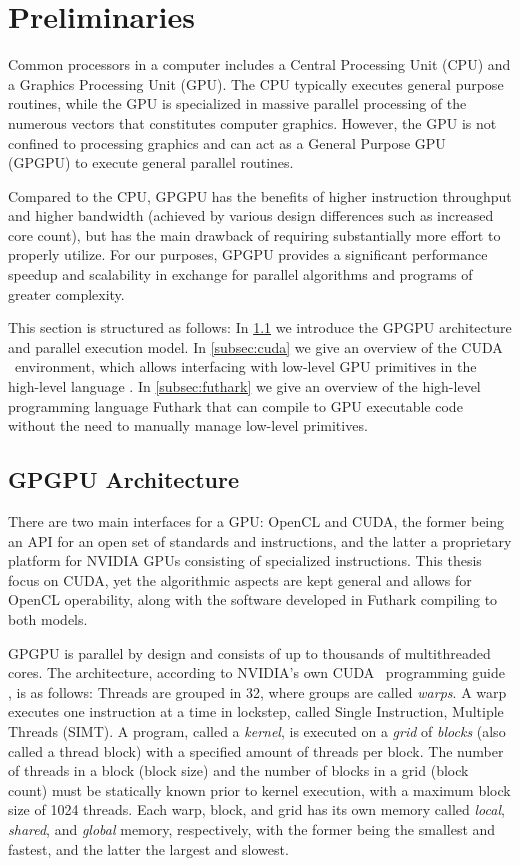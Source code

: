 \section{Preliminaries}
\label{sec:pre}
Common processors in a computer includes a Central Processing Unit (CPU) and a
Graphics Processing Unit (GPU). The CPU typically executes general purpose
routines, while the GPU is specialized in massive parallel processing of the
numerous vectors that constitutes computer graphics. However, the GPU is not
confined to processing graphics and can act as a General Purpose GPU (GPGPU) to
execute general parallel routines.

Compared to the CPU, GPGPU has the benefits of higher instruction throughput and
higher bandwidth (achieved by various design differences such as increased core
count), but has the main drawback of requiring substantially more effort to
properly utilize. For our purposes, GPGPU provides a significant performance
speedup and scalability in exchange for parallel algorithms and programs of
greater complexity.

This section is structured as follows: In \ref{subsec:gpgpu} we introduce the
GPGPU architecture and parallel execution model. In \ref{subsec:cuda} we give an
overview of the CUDA \cpp\ environment, which allows interfacing with low-level
GPU primitives in the high-level language \cpp. In \ref{subsec:futhark} we give
an overview of the high-level programming language Futhark that can compile to
GPU executable code without the need to manually manage low-level primitives.

\subsection{GPGPU Architecture}
\label{subsec:gpgpu}

There are two main interfaces for a GPU: OpenCL and CUDA, the former being an
API for an open set of standards and instructions, and the latter a proprietary
platform for NVIDIA GPUs consisting of specialized instructions. This thesis
focus on CUDA, yet the algorithmic aspects are kept general and allows for
OpenCL operability, along with the software developed in Futhark compiling to
both models.

GPGPU is parallel by design and consists of up to thousands of multithreaded
cores. The architecture, according to NVIDIA's own CUDA \cpp\ programming guide
\cite{cudaguide}, is as follows: Threads are grouped in 32, where groups are
called \textit{warps}. A warp executes one instruction at a time in lockstep,
called Single Instruction, Multiple Threads (SIMT). A program, called a
\textit{kernel}, is executed on a \textit{grid} of \textit{blocks} (also called
a thread block) with a specified amount of threads per block. The number of
threads in a block (block size) and the number of blocks in a grid (block count)
must be statically known prior to kernel execution, with a maximum block size of
1024 threads. Each warp, block, and grid has its own memory called
\textit{local}, \textit{shared}, and \textit{global} memory, respectively, with
the former being the smallest and fastest, and the latter the largest and
slowest.

